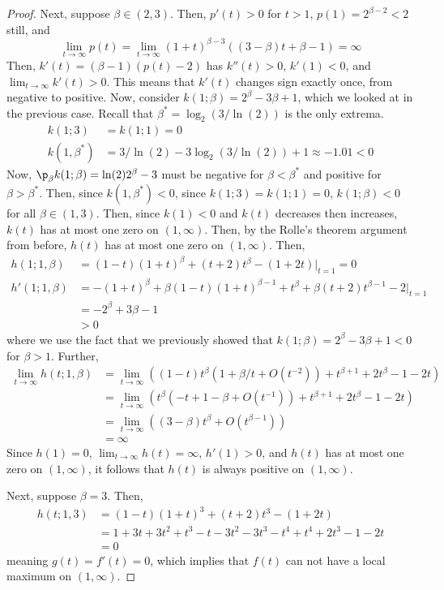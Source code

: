 \documentclass[11pt]{article}
\begin{document}
\begin{proof}
Next, suppose $\beta\in (2,3)$. Then, $p'(t)>0$ for $t>1$, $p(1)=2^{\beta-2}<2$ still, and 
$$\lim_{t\to \infty}p(t)=\lim_{t\to \infty}(1+t)^{\beta-3}((3-\beta)t+\beta-1)=\infty$$
Then, $k'(t)=(\beta-1)(p(t)-2)$ has $k''(t)>0$, $k'(1)<0$, and $\lim_{t\to \infty}k'(t)>0$. This means that $k'(t)$ changes sign exactly once, from negative to positive. Now, consider $k(1;\beta)=2^\beta-3\beta +1$, which we looked at in the previous case. Recall that $\beta^*=\log_2(3/\ln(2))$ is the only extrema. 
\begin{align*}
    k(1;3)&=k(1;1)=0\\
    k(1,\beta^*)&=3/\ln(2)-3\log_2(3/\ln(2))+1\approx -1.01<0
\end{align*}
Now, $\p_\beta k(1;\beta)=\ln(2)2^\beta-3$ must be negative for $\beta < \beta^*$ and positive for $\beta > \beta^*$. Then, since $k(1,\beta^*)<0$, since $k(1;3)=k(1;1)=0$, $k(1;\beta)<0$ for all $\beta \in (1,3)$. Then, since $k(1)<0$ and $k(t)$ decreases then increases, $k(t)$ has at most one zero on $(1,\infty)$. Then, by the Rolle's theorem argument from before, $h(t)$ has at most one zero on $(1,\infty)$. Then,
\begin{align*}
    h(1;1,\beta)&=(1-t)(1+t)^\beta +(t+2)t^\beta -(1+2t)\bigg|_{t=1}=0\\
    h'(1;1,\beta)&=-(1+t)^\beta +\beta(1-t)(1+t)^{\beta-1}+t^\beta +\beta (t+2)t^{\beta-1}-2\bigg|_{t=1}\\
    &=-2^\beta +3\beta-1\\
    &>0
\end{align*}
where we use the fact that we previously showed that $k(1;\beta)=2^\beta -3\beta + 1<0$ for $\beta > 1$. Further,
\begin{align*}
    \lim_{t\to \infty}h(t;1,\beta)&=\lim_{t\to \infty}((1-t)t^\beta(1+\beta/t+O(t^{-2}))+t^{\beta+1}+2t^{\beta}-1-2t)\\
    &=\lim_{t\to \infty}(t^{\beta}(-t+1-\beta +O(t^{-1}))+t^{\beta+1}+2t^{\beta}-1-2t)\\
    &=\lim_{t\to \infty}((3-\beta)t^{\beta}+O(t^{\beta-1}))\\
    &=\infty 
\end{align*}
Since $h(1)=0$, $\lim_{t\to \infty}h(t)=\infty$, $h'(1)>0$, and $h(t)$ has at most one zero on $(1,\infty)$, it follows that $h(t)$ is always positive on $(1,\infty)$. 

Next, suppose $\beta=3$. Then,
\begin{align*}
    h(t;1,3)&=(1-t)(1+t)^3 +(t+2)t^3 -(1+2t)\\
    &=1+3t+3t^2+t^3 -t-3t^2-3t^3 -t^4 +t^4 +2t^3 -1-2t\\
    &=0
\end{align*}
meaning $g(t)=f'(t)=0$, which implies that $f(t)$ can not have a local maximum on $(1,\infty)$. 


\end{proof}
\end{document}
